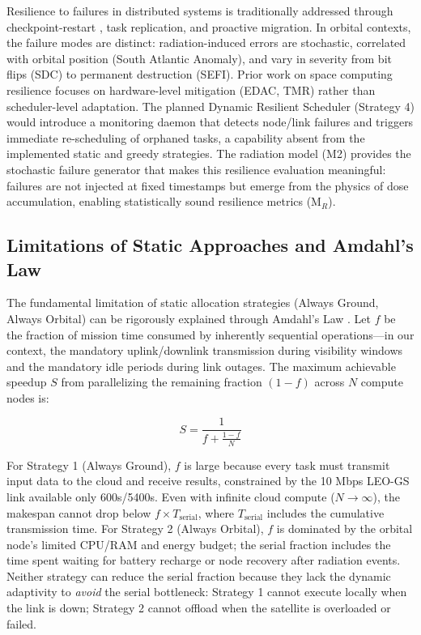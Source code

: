 \documentclass[conference]{IEEEtran}
\begin{document}
Resilience to failures in distributed systems is traditionally addressed through checkpoint-restart \cite{checkpoint}, task replication, and proactive migration. In orbital contexts, the failure modes are distinct: radiation-induced errors are stochastic, correlated with orbital position (South Atlantic Anomaly), and vary in severity from bit flips (SDC) to permanent destruction (SEFI). Prior work on space computing resilience focuses on hardware-level mitigation (EDAC, TMR) rather than scheduler-level adaptation. The planned Dynamic Resilient Scheduler (Strategy 4) would introduce a monitoring daemon that detects node/link failures and triggers immediate re-scheduling of orphaned tasks, a capability absent from the implemented static and greedy strategies. The radiation model (M2) provides the stochastic failure generator that makes this resilience evaluation meaningful: failures are not injected at fixed timestamps but emerge from the physics of dose accumulation, enabling statistically sound resilience metrics (M$_R$).

\subsection{Limitations of Static Approaches and Amdahl's Law}

The fundamental limitation of static allocation strategies (Always Ground, Always Orbital) can be rigorously explained through Amdahl's Law \cite{amdahl1967validity}. Let $f$ be the fraction of mission time consumed by inherently sequential operations---in our context, the mandatory uplink/downlink transmission during visibility windows and the mandatory idle periods during link outages. The maximum achievable speedup $S$ from parallelizing the remaining fraction $(1-f)$ across $N$ compute nodes is:

\begin{equation}
    S = \frac{1}{f + \frac{1-f}{N}}
\end{equation}

For Strategy 1 (Always Ground), $f$ is large because every task must transmit input data to the cloud and receive results, constrained by the 10 Mbps LEO-GS link available only 600s/5400s. Even with infinite cloud compute ($N \to \infty$), the makespan cannot drop below $f \times T_{\text{serial}}$, where $T_{\text{serial}}$ includes the cumulative transmission time. For Strategy 2 (Always Orbital), $f$ is dominated by the orbital node's limited CPU/RAM and energy budget; the serial fraction includes the time spent waiting for battery recharge or node recovery after radiation events. Neither strategy can reduce the serial fraction because they lack the dynamic adaptivity to \textit{avoid} the serial bottleneck: Strategy 1 cannot execute locally when the link is down; Strategy 2 cannot offload when the satellite is overloaded or failed.
\end{document}
